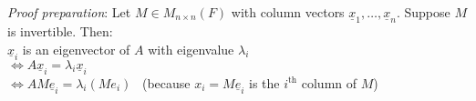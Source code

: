 \documentclass[
  12pt,
  a4paper,
  twoside]{article}
\theoremstyle{plain}
\theoremstyle{definition}
\begin{document}
\emph{Proof preparation}:
Let \(M \in M_{n \times n}(F)\) with column vectors \(\underline{x}_{1}, \dots, \underline{x}_{n}\). Suppose \(M\) is invertible. Then:\\
\hspace*{0.333em}\hspace*{0.333em}\hspace*{0.333em}\hspace*{0.333em}\hspace*{0.333em}\hspace*{0.333em}\hspace*{0.333em}\hspace*{0.333em}\hspace*{0.333em}\hspace*{0.333em}\hspace*{0.333em}\hspace*{0.333em}\(\underline{x}_{i}\) is an eigenvector of \(A\) with eigenvalue \(\lambda_{i}\)\\
\hspace*{0.333em}\hspace*{0.333em}\hspace*{0.333em}\hspace*{0.333em}\hspace*{0.333em}\hspace*{0.333em}\hspace*{0.333em}\hspace*{0.333em}\hspace*{0.333em}\hspace*{0.333em}\hspace*{0.333em}\hspace*{0.333em}\(\iff A \underline{x}_{i} = \lambda_{i} \underline{x}_{i}\)\\
\hspace*{0.333em}\hspace*{0.333em}\hspace*{0.333em}\hspace*{0.333em}\hspace*{0.333em}\hspace*{0.333em}\hspace*{0.333em}\hspace*{0.333em}\hspace*{0.333em}\hspace*{0.333em}\hspace*{0.333em}\hspace*{0.333em}\(\iff AM \underline{e}_{i} = \lambda_{i} (M e_{i})\) \hfill~{(because \(x_{i} = M \underline{e}_{i}\) is the \(i^\mathrm{th}\) column of \(M\))}\\
\end{document}
